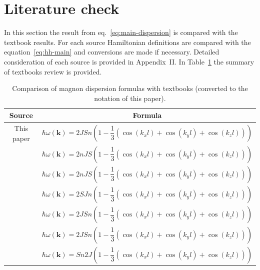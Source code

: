 \documentclass[a4paper,12pt]{article}
\begin{document}
    \section{Literature check}
        In this section the result from eq.~\eqref{eq:main-dispersion} is compared with the textbook results. 
        For each source Hamiltonian definitions are compared with the equation~\eqref{eq:hh-main} and conversions are made if necessary. 
        Detailed consideration of each source is provided in Appendix~II. In Table~\ref{tab:literature-review} the summary of textbooks review is provided.

        \begin{table}[H]
            \centering
            \caption{Comparison of magnon dispersion formulas with textbooks (converted to the notation of this paper).}
            \label{tab:literature-review}
            \def\arraystretch{2.5}
            \begin{tabular}{|c|c|}
                \hline
                Source                             & Formula                                                                                                        \\ \hline
                This paper                         & $\hbar\omega(\mathbf{k}) = 2JSn\left(1 - \dfrac{1}{3}\left(\cos(k_xl) + \cos(k_yl) + \cos(k_zl)\right)\right)$ \\ \hline
                \cite{rezende2020fundamentals}     & $\hbar\omega(\mathbf{k}) = 2nJS\left(1 - \dfrac{1}{3}\left(\cos(k_xl) + \cos(k_yl) + \cos(k_zl)\right)\right)$ \\ \hline
                \cite{blundell2003magnetism}       & $\hbar\omega(\mathbf{k}) = 2nJS\left(1 - \dfrac{1}{3}\left(\cos(k_xl) + \cos(k_yl) + \cos(k_zl)\right)\right)$ \\ \hline
                \cite{gurevich1996magnetization}   & $\hbar\omega(\mathbf{k}) = 2SJn\left(1 - \dfrac{1}{3}\left(\cos(k_xl) + \cos(k_yl) + \cos(k_zl)\right)\right)$ \\ \hline
                \cite{simon2013oxford}             & $\hbar\omega(\mathbf{k}) = 2JSn\left(1 - \dfrac{1}{3}\left(\cos(k_xl) + \cos(k_yl) + \cos(k_zl)\right)\right)$ \\ \hline
                \cite{coey2010magnetism}           & $\hbar\omega(\mathbf{k}) = 2JSn\left(1 - \dfrac{1}{3}\left(\cos(k_xl) + \cos(k_yl) + \cos(k_zl)\right)\right)$ \\ \hline
                \cite{jensen1991rare}              & $\hbar\omega(\mathbf{k}) = Sn2J\left(1 - \dfrac{1}{3}\left(\cos(k_xl) + \cos(k_yl) + \cos(k_zl)\right)\right)$ \\ \hline
            \end{tabular}
        \end{table}
\end{document}
